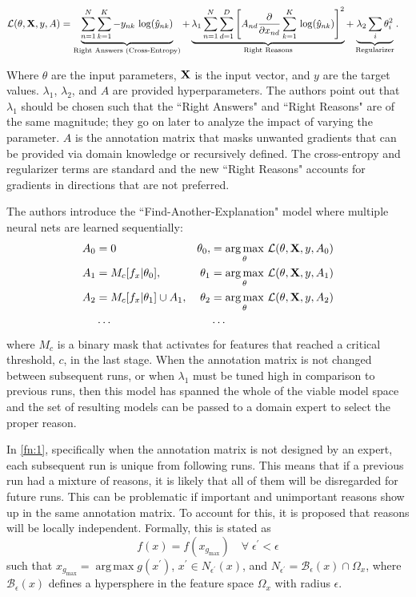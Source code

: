\documentclass[twoside,11pt]{article}
\DeclareMathOperator*{\argmax}{arg\,max}
\begin{document}
\begin{align}
\mathcal{L}(\theta, \vb{X}, y, A) &  = \underbrace{\sum^N_{n=1}\sum^K_{k=1}-y_{nk}\,\log(\hat{y}_{nk})}_\text{Right Answers (Cross-Entropy)} + \underbrace{\lambda_1 \sum^N_{n=1}\sum^D_{d=1}\left[A_{nd}\pdv{x_{nd}}\sum^K_{k=1}\, \log(\hat{y}_{nk})\right]^2}_\text{Right Reasons} + \underbrace{\lambda_2 \sum_i \theta^2_i}_\text{Regularizer}.
\label{fn:1}
\end{align}

Where $\theta$ are the input parameters, $\vb{X}$ is the input vector, and $y$ are the target values. $\lambda_1$, $\lambda_2$, and $A$ are provided hyperparameters. The authors point out that $\lambda_1$ should be chosen such that the ``Right Answers" and ``Right Reasons" are of the same magnitude; they go on later to analyze the impact of varying the parameter. $A$ is the annotation matrix that masks unwanted gradients that can be provided via domain knowledge or recursively defined. The cross-entropy and regularizer terms are standard and the new ``Right Reasons" accounts for gradients in directions that are not preferred. 

The authors introduce the ``Find-Another-Explanation" model where multiple neural nets are learned sequentially:
\begin{align*}
A_0 & = 0 & \theta_0, & = \argmax_\theta \, \mathcal{L}(\theta, \vb{X}, y, A_0)\\
A_1 & = M_c[f_x|\theta_0], & \theta_1 & = \argmax_\theta \, \mathcal{L}(\theta, \vb{X}, y, A_1)\\
A_2 & = M_c[f_x|\theta_1]\cup A_1, & \theta_2 & = \argmax_\theta \, \mathcal{L}(\theta, \vb{X}, y, A_2)\\
&\cdots & &\cdots
\end{align*}
where $M_c$ is a binary mask that activates for features that reached a critical threshold, $c$, in the last stage. When the annotation matrix is not changed between subsequent runs, or when $\lambda_1$ must be tuned high in comparison to previous runs, then this model has spanned the whole of the viable model space and the set of resulting models can be passed to a  domain expert to select the proper reason. 

In \cref{fn:1}, specifically when the annotation matrix is not designed by an expert, each subsequent run is unique from following runs. This means that if a previous run had a mixture of reasons, it is likely that all of them will be disregarded for future runs. This can be problematic if important and unimportant reasons show up in the same annotation matrix. To account for this, it is proposed that reasons will be locally independent. Formally, this is stated as 
\[f(x) = f(x_{g_\text{max}}) \quad \forall \; \epsilon^\prime < \epsilon\]
such that $x_{g_\text{max}} = \argmax g(x^\prime)$, $x^\prime \in N_{\epsilon^\prime}(x)$, and $N_{\epsilon^\prime} = \mathcal{B}_\epsilon(x) \cap \Omega_x$, where $\mathcal{B}_\epsilon(x)$ defines a hypersphere in the feature space $\Omega_x$ with radius $\epsilon$. 
\end{document}

